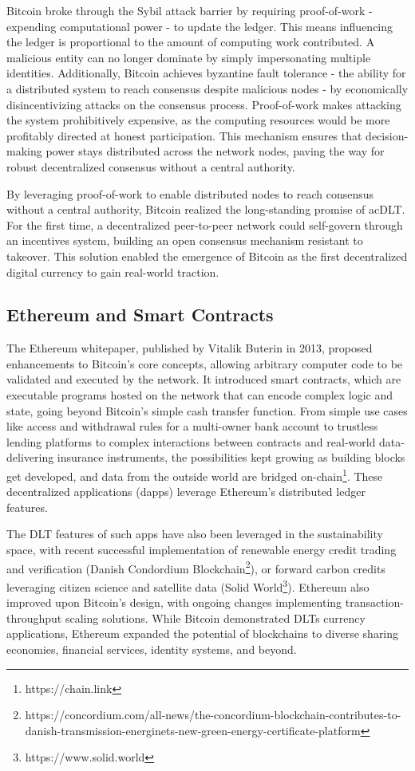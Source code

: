 \documentclass[11pt]{report}
\begin{document}
Bitcoin broke through the Sybil attack barrier by requiring proof-of-work - expending computational power - to update the ledger. This means influencing the ledger is proportional to the amount of computing work contributed. A malicious entity can no longer dominate by simply impersonating multiple identities. Additionally, Bitcoin achieves byzantine fault tolerance - the ability for a distributed system to reach consensus despite malicious nodes - by economically disincentivizing attacks on the consensus process. Proof-of-work makes attacking the system prohibitively expensive, as the computing resources would be more profitably directed at honest participation. This mechanism ensures that decision-making power stays distributed across the network nodes, paving the way for robust decentralized consensus without a central authority.

By leveraging proof-of-work to enable distributed nodes to reach consensus without a central authority, Bitcoin realized the long-standing promise of ac{DLT}. For the first time, a decentralized peer-to-peer network could self-govern through an incentives system, building an open consensus mechanism resistant to takeover. This solution enabled the emergence of Bitcoin as the first decentralized digital currency to gain real-world traction.

\subsection{Ethereum and Smart Contracts}

The Ethereum whitepaper\cite{buterinEthereumNextgenerationSmart}, published by Vitalik Buterin in 2013, proposed enhancements to Bitcoin's core concepts, allowing arbitrary computer code to be validated and executed by the network. It introduced smart contracts, which are executable programs hosted on the network that can encode complex logic and state, going beyond Bitcoin's simple cash transfer function. From simple use cases like access and withdrawal rules for a multi-owner bank account to trustless lending platforms to complex interactions between contracts and real-world data-delivering insurance instruments, the possibilities kept growing as building blocks get developed, and data from the outside world are bridged on-chain\footnote{https://chain.link}. These decentralized applications (dapps) leverage Ethereum's distributed ledger features.

The \ac{DLT} features of such apps have also been leveraged in the sustainability space, with recent successful implementation of renewable energy credit trading and verification (Danish Condordium Blockchain\footnote{https://concordium.com/all-news/the-concordium-blockchain-contributes-to-danish-transmission-energinets-new-green-energy-certificate-platform}), or forward carbon credits leveraging citizen science and satellite data (Solid World\footnote{https://www.solid.world}). Ethereum also improved upon Bitcoin's design, with ongoing changes implementing transaction-throughput scaling solutions. While Bitcoin demonstrated \ac{DLT}s currency applications, Ethereum expanded the potential of blockchains to diverse sharing economies, financial services, identity systems, and beyond.
\end{document}
